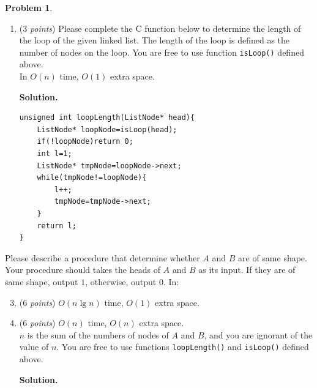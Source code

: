 \documentclass[12pt,a4paper]{report}
\newcommand{\points}[1]{ ($#1$ \textit{points}) }
\theoremstyle{definition}
\newtheorem{problem}{\textbf{Problem}}
\newcommand{\solution}{\noindent\textbf{Solution.}}
\theoremstyle{definition}
\begin{document}
\begin{problem}
\begin{enumerate}[label=\arabic*.]
\begin{enumerate}[label=\alph*.]
        (Hint: Consider two pointers pointing to the head initially and moving at different speed.)
\begin{framed}
\solution

\begin{lstlisting}[style=CStyle]
typedef struct listnode{
    int data;
    struct listnode *next;
}ListNode;

ListNode* isLoop(ListNode* head){
    ListNode* ptr_slow, ptr_fast=head;
    while(ptr_slow!=ptr_fast&&ptr_fast){
        ptr_slow=ptr_slow->next;
        ptr_fast=ptr_fast->next;
        if(ptr_fast->next)ptr_fast=ptr_fast->next;
    }
    return ptr_fast;
}
\end{lstlisting}
\end{framed}

        \item \points{3}Please complete the C function below to determine the length of the loop of the given linked list. The length of the loop is defined as the number of nodes on the loop. You are free to use function \texttt{isLoop()} defined above.\\
        In $O(n)$ time, $O(1)$ extra space.

\begin{framed}
\solution

\begin{lstlisting}[style=CStyle]
unsigned int loopLength(ListNode* head){
    ListNode* loopNode=isLoop(head);
    if(!loopNode)return 0;
    int l=1;
    ListNode* tmpNode=loopNode->next;
    while(tmpNode!=loopNode){
        l++;
        tmpNode=tmpNode->next;
    }
    return l;
}
\end{lstlisting}
\end{framed}
\end{enumerate}
        Please describe a procedure that determine whether $A$ and $B$ are of same shape. Your procedure should takes the heads of $A$ and $B$ as its input. If they are of same shape, output $1$, otherwise, output $0$. In:
\begin{enumerate}[label=\alph*.]
    \setcounter{enumii}{2}
        \item \points{6}$O(n \lg n)$ time, $O(1)$ extra space.
        \item \points{6}$O(n)$ time, $O(n)$ extra space.\\
    \noindent $n$ is the sum of the numbers of nodes of $A$ and $B$, and you are ignorant of the value of $n$. You are free to use functions \texttt{loopLength()} and \texttt{isLoop()} defined above.
\begin{framed}
\solution
    

\end{framed}
\end{enumerate}
\end{enumerate}
\end{problem}
\end{document}
